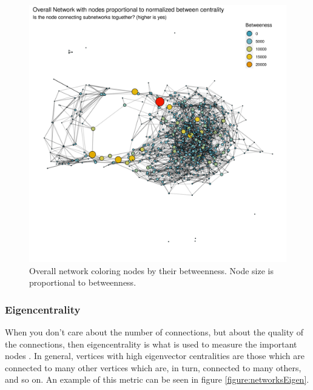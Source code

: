     \begin{figure}[h!]
        \centering
            \includegraphics[width=0.9\linewidth]{figures/Networks/Centralities/Graph_overallEdgesDF_centralitiesDF_Betweeness___mds.png} 
        \caption{Overall network coloring nodes by their betweenness. Node size is proportional to betweenness.}
        \label{figure:networksBetweenness}
    \end{figure}      

\subsubsection{Eigencentrality}

When you don't care about the number of connections, but about the quality of the connections, then eigencentrality is what is used to measure the important nodes \cite{Bonacich1972}. In general, vertices with high eigenvector centralities are those which are connected to many other vertices which are, in turn, connected to many others, and so on. An example of this metric can be seen in figure \ref{figure:networksEigen}.


